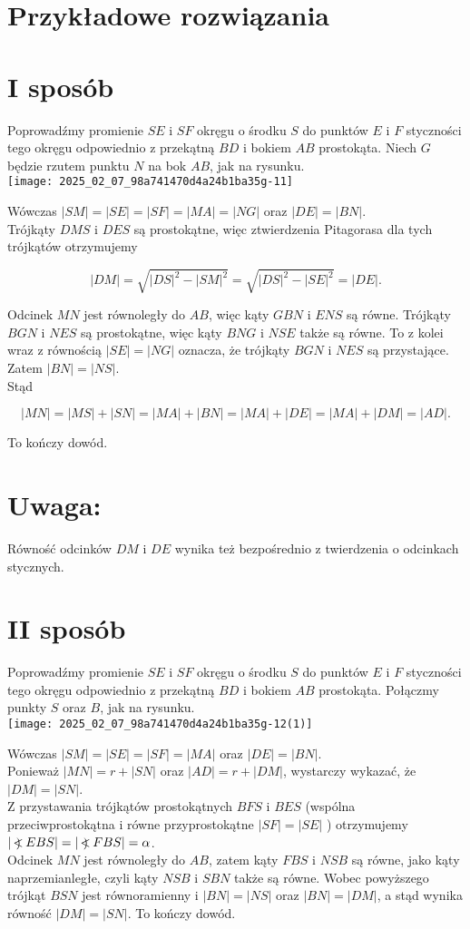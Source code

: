 \documentclass[10pt]{article}
\newcommand\Varangle{\mathop{{<\!\!\!\!\!\text{\small)}}\:}\nolimits}
\begin{document}
\section*{Przykładowe rozwiązania}
\section*{I sposób}
Poprowadźmy promienie $S E$ i $S F$ okręgu o środku $S$ do punktów $E$ i $F$ styczności tego okręgu odpowiednio z przekątną $B D$ i bokiem $A B$ prostokąta. Niech $G$ będzie rzutem punktu $N$ na bok $A B$, jak na rysunku.\\
\texttt{[image: 2025\_02\_07\_98a741470d4a24b1ba35g-11]}

Wówczas $|S M|=|S E|=|S F|=|M A|=|N G|$ oraz $|D E|=|B N|$.\\
Trójkąty $D M S$ i $D E S$ są prostokątne, więc ztwierdzenia Pitagorasa dla tych trójkątów otrzymujemy

$$
|D M|=\sqrt{|D S|^{2}-|S M|^{2}}=\sqrt{|D S|^{2}-|S E|^{2}}=|D E| .
$$

Odcinek $M N$ jest równoległy do $A B$, więc kąty $G B N$ i $E N S$ są równe. Trójkąty $B G N$ i $N E S$ są prostokątne, więc kąty $B N G$ i $N S E$ także są równe. To z kolei wraz z równością $|S E|=|N G|$ oznacza, że trójkąty $B G N$ i $N E S$ są przystające. Zatem $|B N|=|N S|$.\\
Stąd

$$
|M N|=|M S|+|S N|=|M A|+|B N|=|M A|+|D E|=|M A|+|D M|=|A D| .
$$

To kończy dowód.

\section*{Uwaga:}
Równość odcinków $D M$ i $D E$ wynika też bezpośrednio z twierdzenia o odcinkach stycznych.

\section*{II sposób}
Poprowadźmy promienie $S E$ i $S F$ okręgu o środku $S$ do punktów $E$ i $F$ styczności tego okręgu odpowiednio z przekątną $B D$ i bokiem $A B$ prostokąta. Połączmy punkty $S$ oraz $B$, jak na rysunku.\\
\texttt{[image: 2025\_02\_07\_98a741470d4a24b1ba35g-12(1)]}

Wówczas $|S M|=|S E|=|S F|=|M A|$ oraz $|D E|=|B N|$.\\
Ponieważ $|M N|=r+|S N|$ oraz $|A D|=r+|D M|$, wystarczy wykazać, że $|D M|=|S N|$.\\
Z przystawania trójkątów prostokątnych $B F S$ i $B E S$ (wspólna przeciwprostokątna i równe przyprostokątne $|S F|=|S E|$ ) otrzymujemy $|\Varangle E B S|=|\Varangle F B S|=\alpha$.\\
Odcinek $M N$ jest równoległy do $A B$, zatem kąty $F B S$ i $N S B$ są równe, jako kąty naprzemianległe, czyli kąty $N S B$ i $S B N$ także są równe. Wobec powyższego trójkąt $B S N$ jest równoramienny i $|B N|=|N S|$ oraz $|B N|=|D M|$, a stąd wynika równość $|D M|=|S N|$. To kończy dowód.
\end{document}
